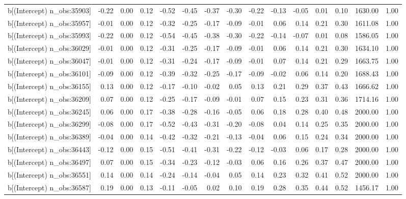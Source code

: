 \begin{table}[ht]
\begin{tabular}{rrrrrrrrrrrrrrr}
  b[(Intercept) n\_obs:35903] & -0.22 & 0.00 & 0.12 & -0.52 & -0.45 & -0.37 & -0.30 & -0.22 & -0.13 & -0.05 & 0.01 & 0.10 & 1630.00 & 1.00 \\ 
  b[(Intercept) n\_obs:35957] & -0.01 & 0.00 & 0.12 & -0.32 & -0.25 & -0.17 & -0.09 & -0.01 & 0.06 & 0.14 & 0.21 & 0.30 & 1611.08 & 1.00 \\ 
  b[(Intercept) n\_obs:35993] & -0.22 & 0.00 & 0.12 & -0.54 & -0.45 & -0.38 & -0.30 & -0.22 & -0.14 & -0.07 & 0.01 & 0.08 & 1586.05 & 1.00 \\ 
  b[(Intercept) n\_obs:36029] & -0.01 & 0.00 & 0.12 & -0.31 & -0.25 & -0.17 & -0.09 & -0.01 & 0.06 & 0.14 & 0.21 & 0.30 & 1634.10 & 1.00 \\ 
  b[(Intercept) n\_obs:36047] & -0.01 & 0.00 & 0.12 & -0.31 & -0.24 & -0.17 & -0.09 & -0.01 & 0.07 & 0.14 & 0.21 & 0.29 & 1663.75 & 1.00 \\ 
  b[(Intercept) n\_obs:36101] & -0.09 & 0.00 & 0.12 & -0.39 & -0.32 & -0.25 & -0.17 & -0.09 & -0.02 & 0.06 & 0.14 & 0.20 & 1688.43 & 1.00 \\ 
  b[(Intercept) n\_obs:36155] & 0.13 & 0.00 & 0.12 & -0.17 & -0.10 & -0.02 & 0.05 & 0.13 & 0.21 & 0.29 & 0.37 & 0.43 & 1666.62 & 1.00 \\ 
  b[(Intercept) n\_obs:36209] & 0.07 & 0.00 & 0.12 & -0.25 & -0.17 & -0.09 & -0.01 & 0.07 & 0.15 & 0.23 & 0.31 & 0.36 & 1714.16 & 1.00 \\ 
  b[(Intercept) n\_obs:36245] & 0.06 & 0.00 & 0.17 & -0.38 & -0.28 & -0.16 & -0.05 & 0.06 & 0.18 & 0.28 & 0.40 & 0.48 & 2000.00 & 1.00 \\ 
  b[(Intercept) n\_obs:36299] & -0.08 & 0.00 & 0.17 & -0.52 & -0.43 & -0.31 & -0.20 & -0.08 & 0.04 & 0.14 & 0.25 & 0.35 & 2000.00 & 1.00 \\ 
  b[(Intercept) n\_obs:36389] & -0.04 & 0.00 & 0.14 & -0.42 & -0.32 & -0.21 & -0.13 & -0.04 & 0.06 & 0.15 & 0.24 & 0.34 & 2000.00 & 1.00 \\ 
  b[(Intercept) n\_obs:36443] & -0.12 & 0.00 & 0.15 & -0.51 & -0.41 & -0.31 & -0.22 & -0.12 & -0.03 & 0.06 & 0.17 & 0.28 & 2000.00 & 1.00 \\ 
  b[(Intercept) n\_obs:36497] & 0.07 & 0.00 & 0.15 & -0.34 & -0.23 & -0.12 & -0.03 & 0.06 & 0.16 & 0.26 & 0.37 & 0.47 & 2000.00 & 1.00 \\ 
  b[(Intercept) n\_obs:36551] & 0.14 & 0.00 & 0.14 & -0.24 & -0.14 & -0.04 & 0.05 & 0.14 & 0.23 & 0.32 & 0.41 & 0.52 & 2000.00 & 1.00 \\ 
  b[(Intercept) n\_obs:36587] & 0.19 & 0.00 & 0.13 & -0.11 & -0.05 & 0.02 & 0.10 & 0.19 & 0.28 & 0.35 & 0.44 & 0.52 & 1456.17 & 1.00 \\ 

\end{tabular}
\end{table}
